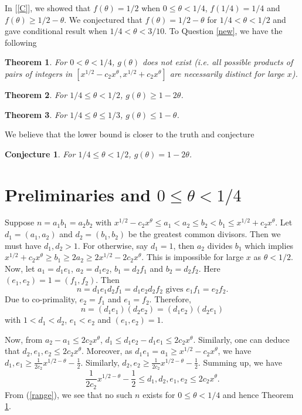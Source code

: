 \documentclass{article}
\newtheorem{thm}{Theorem}[section]
\newtheorem{conj}{Conjecture}[section]
\begin{document}
In [\ref{C}], we showed that $f(\theta) = 1/2$ when $0 \leq \theta < 1/4$, $f(1/4) = 1/4$ and $f(\theta) \geq 1/2 - \theta$. We conjectured that $f(\theta) = 1/2 - \theta$ for $1/4 < \theta < 1/2$ and gave conditional result when $1/4 < \theta < 3/10$. To Question \ref{new}, we have the following
\begin{thm}
\label{theorem1}
For $0 < \theta < 1/4$, $g(\theta)$ does not exist (i.e. all possible products of pairs of integers in $[x^{1/2} - c_2 x^\theta, x^{1/2} + c_2 x^\theta]$ are necessarily distinct for large $x$).
\end{thm}
\begin{thm}
\label{theorem2}
For $1/4 \leq \theta < 1/2$, $g(\theta) \geq 1 - 2\theta$.
\end{thm}
\begin{thm}
\label{theorem3}
For $1/4 \leq \theta \leq 1/3$, $g(\theta) \leq 1 - \theta$.
\end{thm}
We believe that the lower bound is closer to the truth and conjecture
\begin{conj}
\label{conj1}
For $1/4 \leq \theta < 1/2$, $g(\theta) = 1 - 2\theta$.
\end{conj}
\section{Preliminaries and $0 \leq \theta < 1/4$}
Suppose $n = a_1 b_1 = a_2 b_2$ with $x^{1/2} - c_2 x^\theta \leq a_1 < a_2 \leq b_2 < b_1 \leq x^{1/2} + c_2 x^\theta$. Let $d_1 = (a_1, a_2)$ and $d_2 = (b_1, b_2)$ be the greatest common divisors. Then we must have $d_1, d_2 > 1$. For otherwise, say $d_1 = 1$, then $a_2$ divides $b_1$ which implies $x^{1/2} + c_2 x^\theta \geq b_1 \geq 2 a_2 \geq 2 x^{1/2} - 2 c_2 x^\theta$. This is impossible for large $x$ as $\theta < 1/2$. Now, let $a_1 = d_1 e_1$, $a_2 = d_1 e_2$, $b_1 = d_2 f_1$ and $b_2 = d_2 f_2$. Here $(e_1, e_2) = 1 = (f_1, f_2)$. Then
$$n = d_1 e_1 d_2 f_1 = d_1 e_2 d_2 f_2 \mbox{ gives } e_1 f_1 = e_2 f_2.$$
Due to co-primality, $e_2 = f_1$ and $e_1 = f_2$. Therefore,
\begin{equation}
\label{form}
n = (d_1 e_1) (d_2 e_2) = (d_1 e_2) (d_2 e_1)
\end{equation}
with $1< d_1 < d_2$, $e_1 < e_2$ and $(e_1, e_2) = 1$.

\smallskip

Now, from $a_2 - a_1 \leq 2c_2 x^\theta$, $d_1 \leq d_1 e_2 - d_1 e_1 \leq 2c_2 x^\theta$. Similarly, one can deduce that $d_2, e_1, e_2 \leq 2c_2 x^\theta$. Moreover, as $d_1 e_1 = a_1 \geq x^{1/2} - c_2 x^\theta$, we have $d_1, e_1 \geq \frac{1}{2c_2} x^{1/2 - \theta} - \frac{1}{2}$. Similarly, $d_2, e_2 \geq \frac{1}{2c_2} x^{1/2 - \theta} - \frac{1}{2}$. Summing up, we have
\begin{equation}
\label{range}
\frac{1}{2c_2} x^{1/2 - \theta} - \frac{1}{2} \leq d_1, d_2, e_1, e_2 \leq 2c_2 x^\theta.
\end{equation}
From (\ref{range}), we see that no such $n$ exists for $0 \leq \theta < 1/4$ and hence Theorem \ref{theorem1}.
\end{document}
